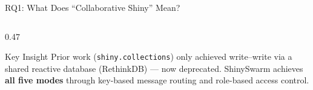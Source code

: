 \documentclass[aspectratio=169]{beamer}
\begin{document}
\begin{frame}{RQ1: What Does ``Collaborative Shiny'' Mean?}
\begin{columns}[T]
\begin{column}{0.47\textwidth}
\vspace{0.5em}
\begin{alertblock}{Key Insight}
\small
Prior work (\texttt{shiny.collections}) only achieved write--write via a shared reactive database (RethinkDB) --- now deprecated. ShinySwarm achieves \textbf{all five modes} through key-based message routing and role-based access control.
\end{alertblock}

\end{column}
\end{columns}

\end{frame}

\end{document}
